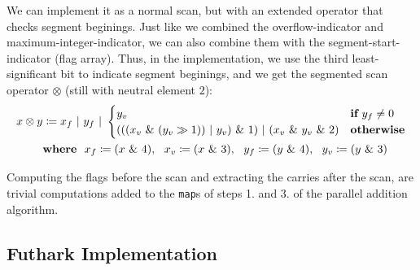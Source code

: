 We can implement it as a normal scan, but with an extended operator that checks
segment beginings. Just like we combined the overflow-indicator and
maximum-integer-indicator, we can also combine them with the
segment-start-indicator (flag array). Thus, in the implementation, we use the
third least-significant bit to indicate segment beginings, and we get the
segmented scan operator $\otimes$ (still with neutral element $2$):
\begin{align}
  \label{eq:segscanop}
  x \otimes y &\coloneq x_f~|~y_f~|~\begin{cases} y_v & \textbf{if}~y_f \neq 0 \\ (((x_v~\&~(y_v \gg 1))~|~y_v)~\&~1)~|~(x_v~\&~y_v~\&~2) & \textbf{otherwise}\end{cases}\\
  & \textbf{where}~~x_f\coloneq (x~\&~4),~~x_v\coloneq (x~\&~3),~~y_f\coloneq (y~\&~4),~~y_v\coloneq (y~\&~3)\notag
\end{align}

Computing the flags before the scan and extracting the carries after the scan,
are trivial computations added to the \texttt{map}s of steps 1. and 3. of the
parallel addition algorithm.

\subsection{Futhark Implementation}
\label{subsec:addfut}

